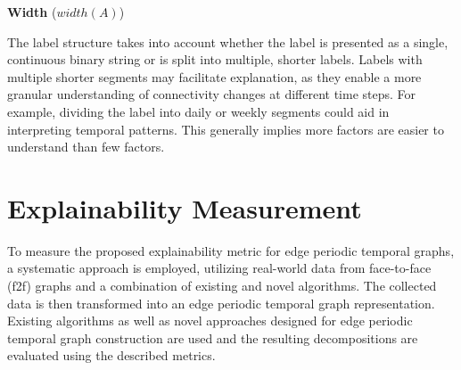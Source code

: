 \textbf{Width} ($width(A)$)

The label structure takes into account whether the label is presented as a single, continuous binary string or is split into multiple, shorter labels. Labels with multiple shorter segments may facilitate explanation, as they enable a more granular understanding of connectivity changes at different time steps. For example, dividing the label into daily or weekly segments could aid in interpreting temporal patterns. This generally implies more factors are easier to understand than few factors.

\section{Explainability Measurement}

To measure the proposed explainability metric for edge periodic temporal graphs, a systematic approach is employed, utilizing real-world data from face-to-face (f2f) graphs and a combination of existing and novel algorithms. The collected data is then transformed into an edge periodic temporal graph representation. Existing algorithms as well as novel approaches designed for edge periodic temporal graph construction are used and the resulting decompositions are evaluated using the described metrics.